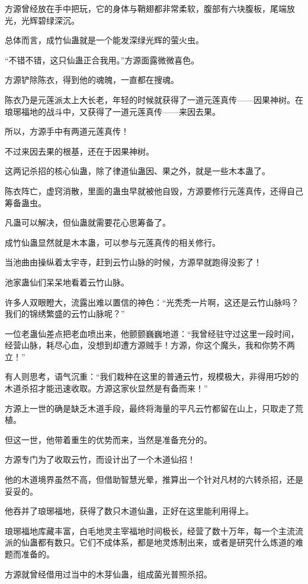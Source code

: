 \begin{this_body}
方源曾经放在手中把玩，它的身体与鞘翅都非常柔软，腹部有六块腹板，尾端放光，光辉碧绿深沉。

总体而言，成竹仙蛊就是一个能发深绿光辉的萤火虫。

“不错不错，这只仙蛊正合我用。”方源面露微微喜色。

方源铲除陈衣，得到他的魂魄，一直都在搜魂。

陈衣乃是元莲派太上大长老，年轻的时候就获得了一道元莲真传——因果神树。在琅琊福地的战斗中，又获得了一道元莲真传——来因去果。

所以，方源手中有两道元莲真传！

不过来因去果的根基，还在于因果神树。

这两记杀招的核心仙蛊，除了律道仙蛊因、果之外，就是一些木本蛊了。

陈衣阵亡，虚窍消散，里面的蛊虫早就被他自毁，方源要修行元莲真传，还得自己筹备蛊虫。

凡蛊可以解决，但仙蛊就需要花心思筹备了。

成竹仙蛊显然就是木本蛊，可以参与元莲真传的相关修行。

当池曲由操纵着太宇寺，赶到云竹山脉的时候，方源早就跑得没影了！

池家蛊仙们呆呆地看着云竹山脉。

许多人双眼瞪大，流露出难以置信的神色：“光秃秃一片啊，这还是云竹山脉吗？我们的锦绣繁盛的云竹山脉呢？”

一位老蛊仙差点把老血喷出来，他颤颤巍巍地道：“我曾经驻守过这里一段时间，经营山脉，耗尽心血，没想到却遭方源贼手！方源，你这个魔头，我和你势不两立！”

有人则思考，语气沉重：“我们栽种在这里的普通云竹，规模极大，非得用巧妙的木道杀招才能迅速收取。方源这家伙显然是有备而来！”

方源上一世的确是缺乏木道手段，最终将海量的平凡云竹都留在山上，只取走了荒植。

但这一世，他带着重生的优势而来，当然是准备充分的。

方源专门为了收取云竹，而设计出了一个木道仙招！

他的木道境界虽然不高，但借助智慧光晕，推算出一个针对凡材的六转杀招，还是妥妥的。

他吞并了琅琊福地，获得了数只木道仙蛊，正好在这里能利用得上。

琅琊福地库藏丰富，白毛地灵主宰福地时间极长，经营了数十万年，每一个主流流派的仙蛊都有数只。它们不成体系，都是地灵炼制出来，或者是研究什么炼道的难题而准备的。

方源就曾经借用过当中的木芽仙蛊，组成菌光普照杀招。


\end{this_body}
